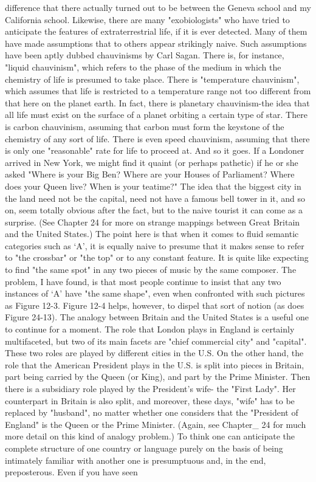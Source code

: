 difference that there actually turned out to be between the Geneva school and my
California school.
         Likewise, there are many "exobiologists" who have tried to anticipate the features
of extraterrestrial life, if it is ever detected. Many of them have made assumptions that to
others appear strikingly naive. Such assumptions have been aptly dubbed chauvinisms by
Carl Sagan. There is, for instance, "liquid chauvinism", which refers to the phase of the
medium in which the chemistry of life is presumed to take place. There is "temperature
chauvinism", which assumes that life is restricted to a temperature range not too different
from that here on the planet earth. In fact, there is planetary chauvinism-the idea that all
life must exist on the surface of a planet orbiting a certain type of star. There is carbon
chauvinism, assuming that carbon must form the keystone of the chemistry of any sort of
life. There is even speed chauvinism, assuming that there is only one "reasonable" rate
for life to proceed at. And so it goes.
         If a Londoner arrived in New York, we might find it quaint (or perhaps pathetic)
if he or she asked "Where is your Big Ben? Where are your Houses of Parliament?
Where does your Queen live? When is your teatime?" The idea that the biggest city in the
land need not be the capital, need not have a famous bell tower in it, and so on, seem
totally obvious after the fact, but to the naive tourist it can come as a surprise. (See
Chapter 24 for more on strange mappings between Great Britain and the United States.)
The point here is that when it comes to fluid semantic categories such as `A', it is equally
naive to presume that it makes sense to refer to "the crossbar" or "the top" or to any
constant feature. It is quite like expecting to find "the same spot" in any two pieces of
music by the same composer. The problem, I have found, is that most people continue to
insist that any two instances of `A' have "the same shape", even when confronted with
such pictures as Figure 12-3. Figure 12-4 helps, however, to dispel that sort of notion (as
does Figure 24-13).
         The analogy between Britain and the United States is a useful one to continue for
a moment. The role that London plays in England is certainly multifaceted, but two of its
main facets are "chief commercial city" and "capital". These two roles are played by
different cities in the U.S. On the other hand, the role that the American President plays
in the U.S. is split into pieces in Britain, part being carried by the Queen (or King), and
part by the Prime Minister. Then there is a subsidiary role played by the President's wife-
the "First Lady". Her counterpart in Britain is also split, and moreover, these days, "wife"
has to be replaced by "husband", no matter whether one considers that the "President of
England" is the Queen or the Prime Minister. (Again, see Chapter\_ 24 for much more
detail on this kind of analogy problem.)
         To think one can anticipate the complete structure of one country or language
purely on the basis of being intimately familiar with another one is presumptuous and, in
the end, preposterous. Even if you have seen




